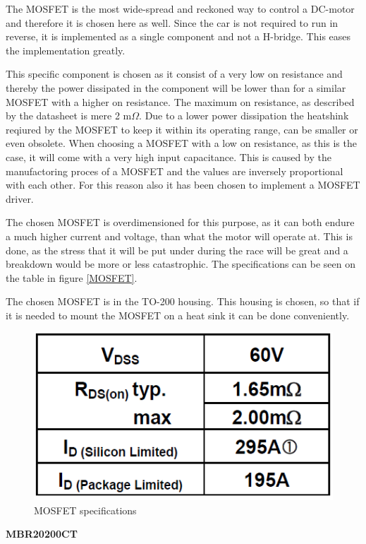 The MOSFET is the most wide-spread and reckoned way to control a DC-motor and therefore it is chosen here as well. Since the car is not required to run in reverse, it is implemented as a single component and not a H-bridge. This eases the implementation greatly.

This specific component is chosen as it consist of a very low on resistance and thereby the power dissipated in the component will be lower than for a similar MOSFET with a higher on resistance. The maximum on resistance, as described by the datasheet is mere 2 m$\Omega$. Due to a lower power dissipation the heatshink reqiured by the MOSFET to keep it within its operating range, can be smaller or even obsolete. When choosing a MOSFET with a low on resistance, as this is the case, it will come with a very high input capacitance. This is caused by the manufactoring proces of a MOSFET and the values are inversely proportional with each other. For this reason also it has been chosen to implement a MOSFET driver. 

The chosen MOSFET is overdimensioned for this purpose, as it can both endure a much higher current and voltage, than what the motor will operate at. This is done, as the stress that it will be put under during the race will be great and a breakdown would be more or less catastrophic. The specifications can be seen on the table in figure \vref{MOSFET}. 

The chosen MOSFET is in the TO-200 housing. This housing is chosen, so that if it is needed to mount the MOSFET on a heat sink it can be done conveniently.  

\begin{figure}[H]
	\centering
	\includegraphics[width=0.85\linewidth]{Hardware/Pictures/MOSFET}
	\caption{MOSFET specifications}
	\label{fig:MOSFET}
\end{figure}

\textbf{MBR20200CT} \cite{MBR20200}


